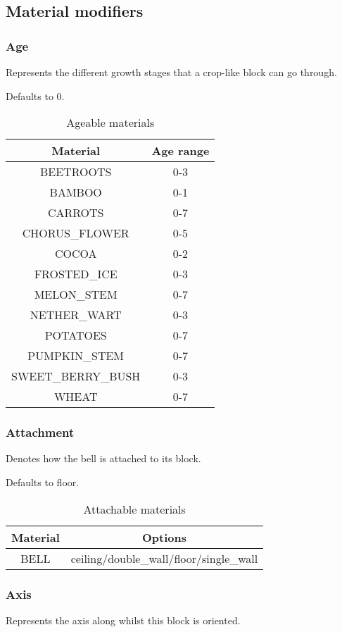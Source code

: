 \subsection{Material modifiers}
\subsubsection{Age}
Represents the different growth stages that a crop-like block can go through.

Defaults to 0.

\begin{table}[H]
	\centering
	\begin{tabular}{ |c|c| }
		\hline
		Material & Age range \\
		\hline
		BEETROOTS & 0-3 \\
		BAMBOO & 0-1 \\
		CARROTS & 0-7 \\
		CHORUS\_FLOWER & 0-5 \\
		COCOA & 0-2 \\
		FROSTED\_ICE & 0-3 \\
		MELON\_STEM & 0-7 \\
		NETHER\_WART & 0-3 \\
		POTATOES & 0-7 \\
		PUMPKIN\_STEM & 0-7 \\
		SWEET\_BERRY\_BUSH & 0-3 \\
		WHEAT & 0-7 \\
		\hline
	\end{tabular}
	\caption{Ageable materials}
\end{table}

\subsubsection{Attachment}
Denotes how the bell is attached to its block.

Defaults to floor.

\begin{table}[H]
	\centering
	\begin{tabular}{ |c|c| }
		\hline
		Material & Options \\
		\hline
		BELL & ceiling/double\_wall/floor/single\_wall \\
		\hline
	\end{tabular}
	\caption{Attachable materials}
\end{table}

\subsubsection{Axis}
Represents the axis along whilst this block is oriented.

